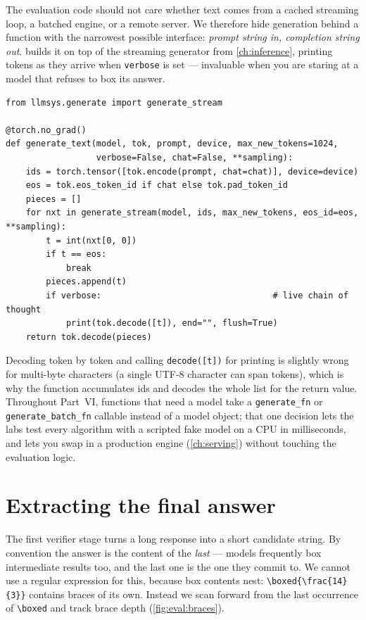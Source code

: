 The evaluation code should not care whether text comes from a cached streaming loop, a batched
engine, or a remote server. We therefore hide generation behind a function with the narrowest
possible interface: \emph{prompt string in, completion string out}.  builds
it on top of the streaming generator from \cref{ch:inference}, printing tokens as they arrive when
\texttt{verbose} is set --- invaluable when you are staring at a model that refuses to box its
answer.

\begin{lstlisting}[caption={Prompt-in, text-out wrapper over the cached streaming generator.},label={lst:eval:wrapper}]
from llmsys.generate import generate_stream

@torch.no_grad()
def generate_text(model, tok, prompt, device, max_new_tokens=1024,
                  verbose=False, chat=False, **sampling):
    ids = torch.tensor([tok.encode(prompt, chat=chat)], device=device)
    eos = tok.eos_token_id if chat else tok.pad_token_id
    pieces = []
    for nxt in generate_stream(model, ids, max_new_tokens, eos_id=eos, **sampling):
        t = int(nxt[0, 0])
        if t == eos:
            break
        pieces.append(t)
        if verbose:                                  # live chain of thought
            print(tok.decode([t]), end="", flush=True)
    return tok.decode(pieces)
\end{lstlisting}

Decoding token by token and calling \texttt{decode([t])} for printing is slightly wrong for
multi-byte characters (a single UTF-8 character can span tokens), which is why the function
accumulates ids and decodes the whole list for the return value. Throughout Part~VI, functions
that need a model take a \texttt{generate\_fn} or \texttt{generate\_batch\_fn} callable instead
of a model object; that one decision lets the labs test every algorithm with a scripted fake
model on a CPU in milliseconds, and lets you swap in a production engine (\cref{ch:serving})
without touching the evaluation logic.

\section{Extracting the final answer}\label{sec:eval:extract}


The first verifier stage turns a long response into a short candidate string. By convention the
answer is the content of the \emph{last} \bx{} --- models frequently box intermediate results
too, and the last one is the one they commit to. We cannot use a regular expression for this,
because box contents nest: \texttt{\textbackslash boxed\{\textbackslash frac\{14\}\{3\}\}}
contains braces of its own. Instead we scan forward from the last occurrence of
\texttt{\textbackslash boxed} and track brace depth (\cref{fig:eval:braces}).

